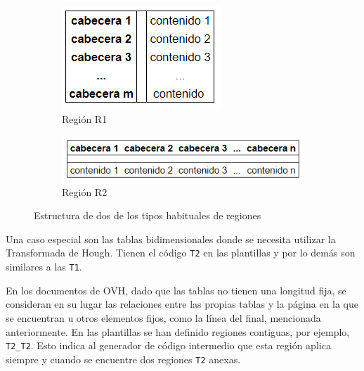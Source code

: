 \begin{figure}
    \centering
    \begin{subfigure}[b]{0.34\textwidth}
        \centering
        \includegraphics[width=\textwidth]{imaxes/g-analisis/region-r1}
        \caption{Región R1}
        \label{fig:region-r1}
    \end{subfigure}
    \hfill
    \begin{subfigure}[b]{0.65\textwidth}
        \centering
        \includegraphics[width=\textwidth]{imaxes/g-analisis/region-r2}
        \caption{Región R2}
        \label{fig:region-r2}
    \end{subfigure}
    \caption{Estructura de dos de los tipos habituales de regiones}
    \label{fig:tipos-de-regiones}
\end{figure}

Una caso especial son las tablas bidimensionales donde se necesita utilizar la Transformada de Hough. Tienen el código \verb|T2| en las plantillas y por lo demás son similares a las \verb|T1|.

En los documentos de OVH, dado que las tablas no tienen una longitud fija, se consideran en su lugar las relaciones entre las propias tablas y la página en la que se encuentran u otros elementos fijos, como la línea del final, mencionada anteriormente. En las plantillas se han definido regiones contiguas, por ejemplo, \verb|T2_T2|. Esto indica al generador de código intermedio que esta región aplica siempre y cuando se encuentre dos regiones \verb|T2| anexas.

